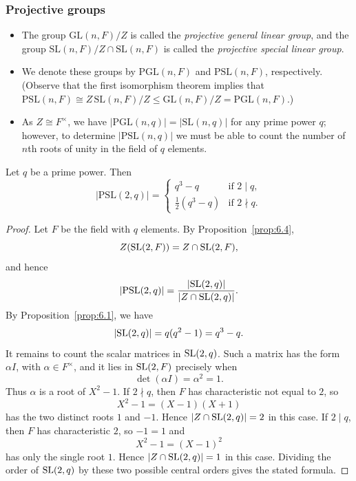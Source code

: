 \documentclass[../Odyssey_Project.tex]{subfiles}
\begin{document}
\subsubsection*{Projective groups}
\begin{itemize}
    \item The group $\mathrm{GL}(n,F)/Z$ is called the \emph{projective general linear group}, and the group $\mathrm{SL}(n,F)/Z \cap \mathrm{SL}(n,F)$ is called the \emph{projective special linear group}.
    \item We denote these groups by $\mathrm{PGL}(n,F)$ and $\mathrm{PSL}(n,F)$, respectively. (Observe that the first isomorphism theorem implies that $\mathrm{PSL}(n,F) \cong Z\,\mathrm{SL}(n,F)/Z \leq \mathrm{GL}(n,F)/Z = \mathrm{PGL}(n,F)$.)
    \item As $Z \cong F^{\times}$, we have $|\mathrm{PGL}(n,q)| = |\mathrm{SL}(n,q)|$ for any prime power $q$; however, to determine $|\mathrm{PSL}(n,q)|$ we must be able to count the number of $n$th roots of unity in the field of $q$ elements.
\end{itemize}

\begin{proposition}
\label{prop:6.5}
Let $q$ be a prime power. Then
\[
|\mathrm{PSL}(2,q)| = \begin{cases} q^3-q & \text{if } 2 \mid q, \\[2pt] \tfrac{1}{2}(q^3-q) & \text{if } 2 \nmid q. \end{cases}
\]
\end{proposition}
\begin{proof}
Let $F$ be the field with $q$ elements. By Proposition~\ref{prop:6.4},
\[
    Z(\operatorname{SL}(2,F))=Z\cap \operatorname{SL}(2,F),
\]
and hence
\[
    \lvert \mathrm{PSL}(2,q)\rvert
    =\frac{\lvert \operatorname{SL}(2,q)\rvert}{\lvert Z\cap \operatorname{SL}(2,q)\rvert}.
\]
By Proposition~\ref{prop:6.1}, we have
\[
    \lvert \operatorname{SL}(2,q)\rvert=q(q^2-1)=q^3-q.
\]
It remains to count the scalar matrices in $\operatorname{SL}(2,q)$. Such a matrix has the form $\alpha I$, with $\alpha\in F^\times$, and it lies in $\operatorname{SL}(2,F)$ precisely when
\[
    \det(\alpha I)=\alpha^2=1.
\]
Thus $\alpha$ is a root of $X^2-1$. If $2\nmid q$, then $F$ has characteristic not equal to $2$, so
\[
    X^2-1=(X-1)(X+1)
\]
has the two distinct roots $1$ and $-1$. Hence $\lvert Z\cap \operatorname{SL}(2,q)\rvert=2$ in this case. If $2\mid q$, then $F$ has characteristic $2$, so $-1=1$ and
\[
    X^2-1=(X-1)^2
\]
has only the single root $1$. Hence $\lvert Z\cap \operatorname{SL}(2,q)\rvert=1$ in this case. Dividing the order of $\operatorname{SL}(2,q)$ by these two possible central orders gives the stated formula.
\end{proof}
\end{document}
